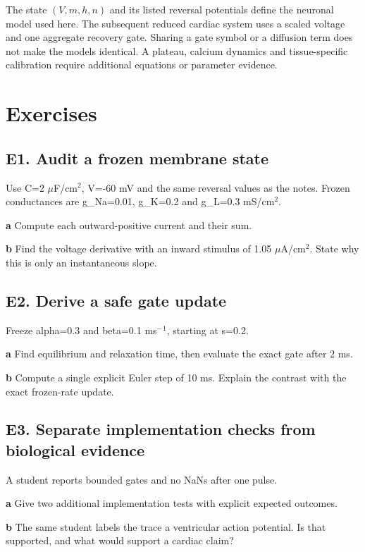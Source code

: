 \documentclass[11pt,letterpaper]{article}
\theoremstyle{definition}\newtheorem{definition}{Definition}\newtheorem{example}{Example}
\numberwithin{equation}{section}
\begin{document}
The state $(V,m,h,n)$ and its listed reversal potentials define the neuronal model used here. The subsequent reduced cardiac system uses a scaled voltage and one aggregate recovery gate. Sharing a gate symbol or a diffusion term does not make the models identical. A plateau, calcium dynamics and tissue-specific calibration require additional equations or parameter evidence.
\bigskip
\section*{Exercises}
\par\noindent\begin{minipage}{\linewidth}
\subsection*{E1. Audit a frozen membrane state}
Use C=\allowbreak{}2 $\mu$F/cm$^2$, V=\allowbreak{}-60 mV and the same reversal values as the notes. Frozen conductances are g\_Na=\allowbreak{}0.01, g\_K=\allowbreak{}0.2 and g\_L=\allowbreak{}0.3 mS/cm$^2$.

\textbf{a} Compute each outward-positive current and their sum.

\end{minipage}\par\medskip
\textbf{b} Find the voltage derivative with an inward stimulus of 1.05 $\mu$A/cm$^2$. State why this is only an instantaneous slope.

\par\noindent\begin{minipage}{\linewidth}
\subsection*{E2. Derive a safe gate update}
Freeze alpha=\allowbreak{}0.3 and beta=\allowbreak{}0.1 ms$^-$$^1$, starting at s=\allowbreak{}0.2.

\textbf{a} Find equilibrium and relaxation time, then evaluate the exact gate after 2 ms.

\end{minipage}\par\medskip
\textbf{b} Compute a single explicit Euler step of 10 ms. Explain the contrast with the exact frozen-rate update.

\par\noindent\begin{minipage}{\linewidth}
\subsection*{E3. Separate implementation checks from biological evidence}
A student reports bounded gates and no NaNs after one pulse.

\textbf{a} Give two additional implementation tests with explicit expected outcomes.

\end{minipage}\par\medskip
\textbf{b} The same student labels the trace a ventricular action potential. Is that supported, and what would support a cardiac claim?
\end{document}
